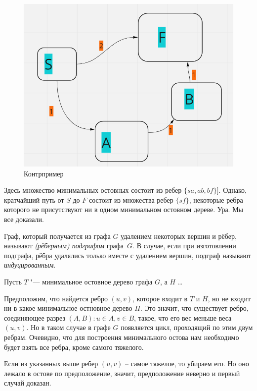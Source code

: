 \documentclass[12pt]{extreport}
\theoremstyle{definiton}
\theoremstyle{definition}
\theoremstyle{definition}
\newcounter{problem}
\newcounter{subproblem}
\def\beforPRskip{
	\bigskip
}
\def\pr{\beforPRskip\noindent\stepcounter{problem}{\bf \theproblem .\;}\setcounter{subproblem}{0}}
\begin{document}
\begin{figure}
	\centering
	\includegraphics[scale=0.6]{graph}
	\caption{Контрпример}
\end{figure}

	Здесь множество минимальных остовных состоит из ребер $\{sa, ab, bf\}]$. Однако, кратчайший путь от $S$ до $F$ состоит из множества ребер $\{sf\}$, некоторые ребра которого не присутствуют ни в одном минимальном остовном дереве. Ура. Мы все доказали.

\medskip
{} Граф, который получается из графа $G$ удалением некоторых вершин и рёбер, называют \emph{(рёберным) подграфом} графа~$G$. В случае, если при изготовлении подграфа, рёбра удалялись только вместе с удалением вершин, подграф называют \emph{индуцированным}.
\medskip

\pr Пусть $T$ "--- минимальное остовное дерево графа $G$, а $H$ \ldots

	Предположим, что найдется ребро $(u, v)$, которое входит в $T$ и $H$, но не входит ни в какое минимальное остновное дерево $H$.
	Это значит, что существует ребро, соединяющее разрез $(A, B) : u \in A, v \in B$, такое, что его вес меньше веса $(u, v)$.
	Но в таком случае в графе $G$ появляется цикл, проходящий по этим двум ребрам. Очевидно, что для построения минимального остова нам необходимо
	будет взять все ребра, кроме самого тяжелого.

	Если из указанных выше ребер $(u, v)$ -- самое тяжелое, то убираем его. Но оно лежало в остове по предположение, значит, предположение неверно и первый случай доказан.
\end{document}
